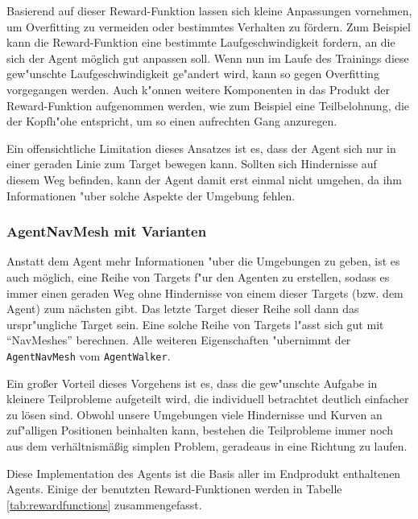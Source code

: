 Basierend auf dieser Reward-Funktion lassen sich kleine Anpassungen vornehmen, um Overfitting zu vermeiden oder bestimmtes Verhalten zu fördern. Zum Beispiel kann die Reward-Funktion eine bestimmte Laufgeschwindigkeit fordern, an die sich der Agent möglich gut anpassen soll. Wenn nun im Laufe des Trainings diese gew"unschte Laufgeschwindigkeit ge"andert wird, kann so gegen Overfitting vorgegangen werden. Auch k"onnen weitere Komponenten in das Produkt der Reward-Funktion aufgenommen werden, wie zum Beispiel eine Teilbelohnung, die der Kopfh"ohe entspricht, um so einen aufrechten Gang anzuregen.

Ein offensichtliche Limitation dieses Ansatzes ist es, dass der Agent sich nur in einer geraden Linie zum Target bewegen kann. Sollten sich Hindernisse auf diesem Weg befinden, kann der Agent damit erst einmal nicht umgehen, da ihm Informationen "uber solche Aspekte der Umgebung fehlen.

\subsubsection{AgentNavMesh mit Varianten}
\label{subsubsec:agentnavmesh}

Anstatt dem Agent mehr Informationen "uber die Umgebungen zu geben, ist es auch möglich, eine Reihe von Targets f"ur den Agenten zu erstellen, sodass es immer einen geraden Weg ohne Hindernisse von einem dieser Targets (bzw. dem Agent) zum nächsten gibt. Das letzte Target dieser Reihe soll dann das urspr"ungliche Target sein. Eine solche Reihe von Targets l"asst sich gut mit \enquote{NavMeshes} berechnen. Alle weiteren Eigenschaften "ubernimmt der \texttt{AgentNavMesh} vom \texttt{AgentWalker}.

Ein großer Vorteil dieses Vorgehens ist es, dass die gew"unschte Aufgabe in kleinere Teilprobleme aufgeteilt wird, die individuell betrachtet deutlich einfacher zu lösen sind. Obwohl unsere Umgebungen viele Hindernisse und Kurven an zuf"alligen Positionen beinhalten kann, bestehen die Teilprobleme immer noch aus dem verhältnismäßig simplen Problem, geradeaus in eine Richtung zu laufen.

Diese Implementation des Agents ist die Basis aller im Endprodukt enthaltenen Agents. Einige der benutzten Reward-Funktionen werden in Tabelle \ref{tab:rewardfunctions} zusammengefasst.

